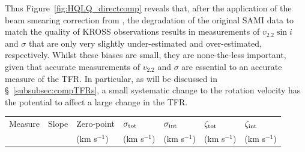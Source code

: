 \documentclass[a4paper,fleqn,usenatbib]{mnras}
\begin{document}
{Thus Figure~\ref{fig:HQLQ_directcomp} reveals that, after the application of the beam smearing correction from \citet{Johnson:2018}, the degradation of the original SAMI data to match the quality of KROSS observations results in measurements of $v_{2.2}\sin i$ and $\sigma$ that are only very slightly under-estimated and over-estimated, respectively. Whilst these biases are small, they are none-the-less important, given that accurate measurements of $v_{2.2}$ and $\sigma$ are essential to an accurate measure of the TFR. In particular, as will be discussed in \S~\ref{subsubsec:compTFRs}, a small systematic change to the rotation velocity has the potential to affect a large change in the TFR.


\begin{table}
\begin{tabular}{ lllllll}
\hline
Measure & Slope  & \phantom{-1}Zero-point & $\sigma_{\rm{tot}}$ & $\sigma_{\rm{int}}$ & $\zeta_{\rm{tot}}$ & $\zeta_{\rm{int}}$ \\
 &    &  \phantom{-1}(km s$^{-1}$) & (km s$^{-1}$) & (km s$^{-1}$) & (km s$^{-1}$) & (km s$^{-1}$) \\


\end{tabular}
\end{table}}
\end{document}
